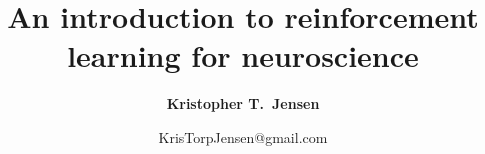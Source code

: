 
\usepackage{graphicx} %
\usepackage[compress]{natbib}
\usepackage[resetlabels]{multibib}

\usepackage{url}            %
\usepackage{float}
\usepackage[table]{xcolor}

\usepackage{caption}
\usepackage{subcaption}
\usepackage{amsmath,amssymb,bm}
\usepackage{multicol}
\usepackage{lineno}
\usepackage{authblk}

\usepackage[colorlinks=true, linkcolor=dblue, citecolor=dred]{hyperref}       %

\usepackage[nameinlink]{cleveref}
\usepackage[margin=1in]{geometry}
\renewcommand\b\bm
\setlength{\parindent}{0pt}
\setlength{\parskip  }{5.5pt}
\setlength\columnsep{30pt}
\setlength\footnotesep{15pt}

\title{An introduction to reinforcement learning for neuroscience \vspace{0.5em}}

\author[1,2]{\normalsize \bfseries Kristopher T.\ Jensen}
\date{\vspace*{-1.5em}
\normalsize KrisTorpJensen@gmail.com
}

